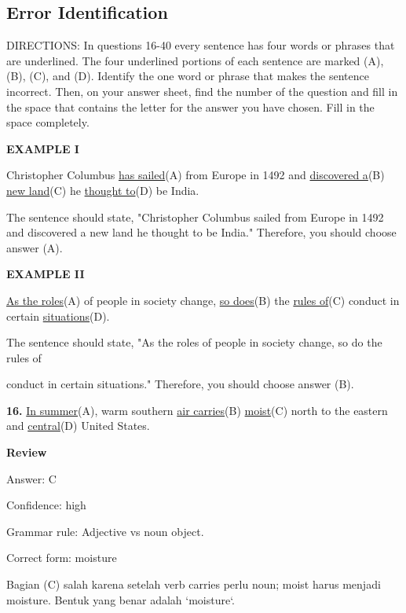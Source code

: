 \documentclass[12pt]{article}
\begin{document}
\subsection*{Error Identification}
DIRECTIONS: In questions 16-40 every sentence has four words or phrases that are underlined. The four underlined portions of each sentence are marked (A), (B), (C), and (D). Identify the one word or phrase that makes the sentence incorrect. Then, on your answer sheet, find the number of the question and fill in the space that contains the letter for the answer you have chosen. Fill in the space completely.\par
\begin{exampleblock}
\textbf{EXAMPLE I}\par
Christopher Columbus \uline{has sailed}(A) from Europe in 1492 and \uline{discovered a}(B) \uline{new land}(C) he \uline{thought to}(D) be India.\par
The sentence should state, "Christopher Columbus sailed from Europe in 1492 and discovered a new land he thought to be India." Therefore, you should choose answer (A).\par
\end{exampleblock}
\begin{exampleblock}
\textbf{EXAMPLE II}\par
\uline{As the roles}(A) of people in society change, \uline{so does}(B) the \uline{rules of}(C) conduct in certain \uline{situations}(D).\par
The sentence should state, "As the roles of people in society change, so do the rules of\par
conduct in certain situations." Therefore, you should choose answer (B).\par
\end{exampleblock}
\noindent\textbf{16.} \uline{In summer}(A), warm southern \uline{air carries}(B) \uline{moist}(C) north to the eastern and \uline{central}(D) United States.
\par
\begingroup
\setlength{\parskip}{0pt}
\setlength{\parindent}{0pt}
\textbf{Review}\par
Answer: C\par
Confidence: high\par
Grammar rule: Adjective vs noun object.\par
Correct form: moisture\par
Bagian (C) salah karena setelah verb carries perlu noun; moist harus menjadi moisture. Bentuk yang benar adalah `moisture`.\par
\end{document}
